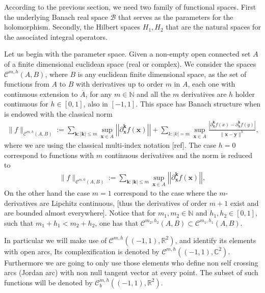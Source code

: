 \documentclass{article}
\newcommand{\todo}[1]{{\color{red}[#1]}}
\newcommand{\IC}{{\mathbb C}}
\newcommand{\IN}{{\mathbb N}}
\newcommand{\IR}{{\mathbb R}}
\newcommand{\cmspaceh}[4]{\mathcal{C}^{#1,#2} \left( #3, #4 \right)}
\newcommand{\rgeoh}[2]{\mathcal{C}_b^{#1,#2}\left( (-1,1), \IR^2 \right)}
\newcommand{\bk}{\bm{k}}
\newcommand{\bx}{\bm{x}}
\newcommand{\by}{\bm{y}}
\begin{document}
According to the previous section, we need two family of functional spaces. First the underlying Banach real space $\mathcal{B}$ that serves as the parameters for the holomorphism. Secondly, the Hilbert spaces $H_1,H_2$ that are the natural spaces for the associated integral operators. 

Let us begin with the parameter space. Given a non-empty open connected set $A$ of a finite dimensional euclidean space (real or complex). We consider the spaces $\cmspaceh{m}{h}{A}{B}$, where $B$ is any euclidean finite dimensional space, as the set of functions from $A$ to $B$ with derivatives up to order $m$ in $A$, each one with continuous extension to $\overline{A}$, for any $m \in \IN$ and all the $m$ derivatives are $h$ holder continuous for $h \in [0,1]$, also in $[-1,1]$. This space has Banach structure when is endowed with the classical norm 
\begin{align*}
\| f \|_{\cmspaceh{m}{h}{A}{B}} := \sum_{\bk: |\bk| \leq m } \sup_{\bx \in A}  \left\vert\left\vert\partial_{\bx}^{\bk} f(\bx) \right\vert\right\vert+ \sum_{k: |k| =m} \sup_{\bx \in A}  \frac{|\partial_{\bx}^{\bk}f(x)-\partial_{\bx}^{\bk}f(y)|}{\| \bx - \by\|^h},
\end{align*}
where we are using the classical multi-index notation \todo{ref}.  The case $h=0$ correspond to functions with $m$ continuous derivatives and the norm is reduced to 
\begin{align*}
\| f \|_{\cmspaceh{m}{0}{A}{B}} := \sum_{\bk: |\bk| \leq m } \sup_{\bx \in A}  \left\vert\left\vert\partial_{\bx}^{\bk} f(\bx) \right\vert\right\vert,
\end{align*}
On the other hand the case $m=1$ correspond to the case where the $m$-derivatives are Lipchitz continuous, \todo{thus the derivatives of order $m+1$ exist and are bounded almost everywhere}. Notice that for $m_1, m_2 \in \IN$ and $h_1, h_2 \in [0,1]$, such that $m_1 + h_1 < m_2 + h_2$, one has that $\cmspaceh{m_2}{h_2}{A}{B} \subset \cmspaceh{m_1}{h_1}{A}{B}$.

In particular we will make use of $\cmspaceh{m}{h}{(-1,1)}{\IR^2}$, and identify its elements with open arcs, Its complexification is denoted by $\cmspaceh{m}{h}{(-1,1)}{\IC^2}$. Furthermore we are going to only use those elements who define non self crossing arcs (Jordan arc) with non null tangent vector at every point. The subset of such functions will be denoted by $\rgeoh{m}{h}$. 
\end{document}
